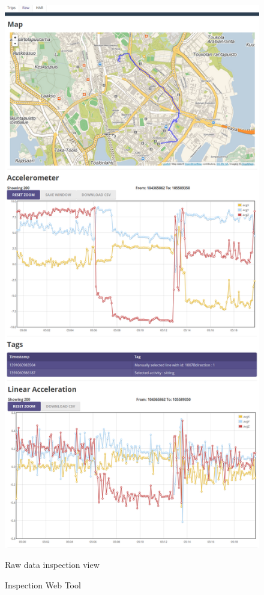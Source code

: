 \begin{figure}[ht]
\begin{minipage}[b]{0.45\linewidth}
    \includegraphics[width=0.9 \textwidth]{img/sc/inspection_raw_tab.png} 
    \caption{Raw data inspection view}\label{fig:minipage2}
  \end{minipage}
  \caption{Inspection Web Tool}
  \label{fig:inspection}
\end{figure}


